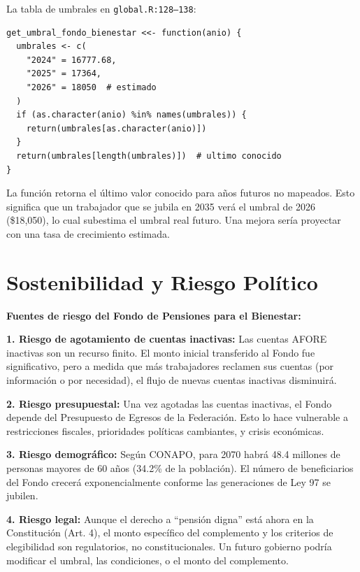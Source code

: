 \documentclass[11pt,a4paper]{report}
\begin{document}
\begin{tcolorbox}[colback=orange!5!white, colframe=orange!75!black, title=\textbf{Aplicaci\'on en C\'odigo}]
La tabla de umbrales en \texttt{global.R:128--138}:

\begin{lstlisting}
get_umbral_fondo_bienestar <<- function(anio) {
  umbrales <- c(
    "2024" = 16777.68,
    "2025" = 17364,
    "2026" = 18050  # estimado
  )
  if (as.character(anio) %in% names(umbrales)) {
    return(umbrales[as.character(anio)])
  }
  return(umbrales[length(umbrales)])  # ultimo conocido
}
\end{lstlisting}

La funci\'on retorna el \'ultimo valor conocido para a\~nos futuros no mapeados. Esto significa que un trabajador que se jubila en 2035 ver\'a el umbral de 2026 (\$18,050), lo cual subestima el umbral real futuro. Una mejora ser\'ia proyectar con una tasa de crecimiento estimada.
\end{tcolorbox}

\section{Sostenibilidad y Riesgo Pol\'itico}

\begin{tcolorbox}[colback=blue!5!white, colframe=blue!75!black, title=\textbf{Definici\'on Formal}]
\textbf{Fuentes de riesgo del Fondo de Pensiones para el Bienestar:}

\textbf{1. Riesgo de agotamiento de cuentas inactivas:}
Las cuentas AFORE inactivas son un recurso finito. El monto inicial transferido al Fondo fue significativo, pero a medida que m\'as trabajadores reclamen sus cuentas (por informaci\'on o por necesidad), el flujo de nuevas cuentas inactivas disminuir\'a.

\textbf{2. Riesgo presupuestal:}
Una vez agotadas las cuentas inactivas, el Fondo depende del Presupuesto de Egresos de la Federaci\'on. Esto lo hace vulnerable a restricciones fiscales, prioridades pol\'iticas cambiantes, y crisis econ\'omicas.

\textbf{3. Riesgo demogr\'afico:}
Seg\'un CONAPO, para 2070 habr\'a 48.4 millones de personas mayores de 60 a\~nos (34.2\% de la poblaci\'on). El n\'umero de beneficiarios del Fondo crecer\'a exponencialmente conforme las generaciones de Ley 97 se jubilen.

\textbf{4. Riesgo legal:}
Aunque el derecho a ``pensi\'on digna'' est\'a ahora en la Constituci\'on (Art. 4), el monto espec\'ifico del complemento y los criterios de elegibilidad son regulatorios, no constitucionales. Un futuro gobierno podr\'ia modificar el umbral, las condiciones, o el monto del complemento.
\end{tcolorbox}
\end{document}
